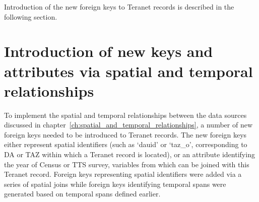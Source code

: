 Introduction of the new foreign keys to Teranet records is described in the following section.

\section{Introduction of new keys and attributes via spatial and temporal relationships} \label{sec:introduction_of_new_keys}

To implement the spatial and temporal relationships between the data sources discussed in chapter~\ref{ch:spatial_and_temporal_relationships}, a number of new foreign keys needed to be introduced to Teranet records.
The new foreign keys either represent spatial identifiers (such as `dauid' or `taz\_o', corresponding to DA or TAZ within which a Teranet record is located), or an attribute identifying the year of Census or TTS survey, variables from which can be joined with this Teranet record.
Foreign keys representing spatial identifiers were added via a series of spatial joins while foreign keys identifying temporal spans were generated based on temporal spans defined earlier.

\vspace{5mm}

